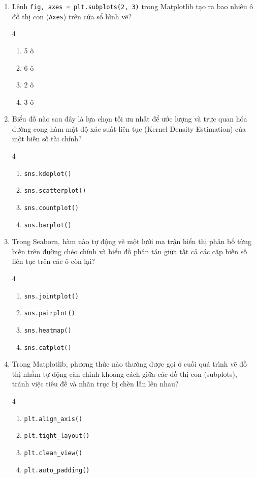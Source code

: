 \documentclass[11pt,a4paper]{article}
\begin{document}
\begin{enumerate}[leftmargin=*,itemsep=2.5pt,resume]
\item Lệnh \texttt{fig, axes = plt.subplots(2, 3)} trong Matplotlib tạo ra bao nhiêu ô đồ thị con (\texttt{Axes}) trên cửa sổ hình vẽ?
\begin{multicols}{4}
\begin{enumerate}[label=\Alph*.]
  \item 5 ô
  \item 6 ô
  \item 2 ô
  \item 3 ô
\end{enumerate}
\end{multicols}

\item Biểu đồ nào sau đây là lựa chọn tối ưu nhất để ước lượng và trực quan hóa đường cong hàm mật độ xác suất liên tục (Kernel Density Estimation) của một biến số tài chính?
\begin{multicols}{4}
\begin{enumerate}[label=\Alph*.]
  \item \texttt{sns.kdeplot()}
  \item \texttt{sns.scatterplot()}
  \item \texttt{sns.countplot()}
  \item \texttt{sns.barplot()}
\end{enumerate}
\end{multicols}

\item Trong Seaborn, hàm nào tự động vẽ một lưới ma trận hiển thị phân bố từng biến trên đường chéo chính và biểu đồ phân tán giữa tất cả các cặp biến số liên tục trên các ô còn lại?
\begin{multicols}{4}
\begin{enumerate}[label=\Alph*.]
  \item \texttt{sns.jointplot()}
  \item \texttt{sns.pairplot()}
  \item \texttt{sns.heatmap()}
  \item \texttt{sns.catplot()}
\end{enumerate}
\end{multicols}

\item Trong Matplotlib, phương thức nào thường được gọi ở cuối quá trình vẽ đồ thị nhằm tự động căn chỉnh khoảng cách giữa các đồ thị con (subplots), tránh việc tiêu đề và nhãn trục bị chèn lấn lên nhau?
\begin{multicols}{4}
\begin{enumerate}[label=\Alph*.]
  \item \texttt{plt.align\_axis()}
  \item \texttt{plt.tight\_layout()}
  \item \texttt{plt.clean\_view()}
  \item \texttt{plt.auto\_padding()}
\end{enumerate}
\end{multicols}


\end{enumerate}
\end{document}
